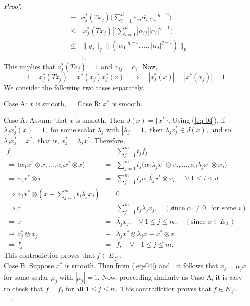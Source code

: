 \documentclass{amsart}
\theoremstyle{definition}
\theoremstyle{remark}
\numberwithin{equation}{section}
\begin{document}
\begin{proof}
\begin{eqnarray*}
&=&x_j^*(Tx_j)\Big(\sum_{i=1}^d\alpha_{ij}\overline{\alpha_i}|\alpha_i|^{q-2}\Big)\\
&\leq&|x_j^*(Tx_j)|\Big(\sum_{i=1}^d|\alpha_{ij}||\alpha_i|^{q-1}\Big)\\
&\leq & \|y_j\|_q\|(|\alpha_1|^{q-1},\ldots,|\alpha_d|^{q-1})\|_p\\
&=&1.
\end{eqnarray*}
This implies that $x_j^*(Tx_j)=1$ and $\alpha_{ij}=\alpha_i.$
Now, 
\begin{equation}\label{eq-04}
1=x_j^*(Tx_j)=x^*(x_j)x_j^*(x)\quad \Rightarrow \quad |x_j^*(x)|=|x^*(x_j)|=1.
\end{equation}
We consider the following two cases separately.
\begin{center}
Case A: $x$ is smooth, $\quad$ Case B: $x^*$ is smooth.
\end{center}
Case A:
Assume that $x$ is smooth. Then $J(x)=\{x^*\}.$ Using (\ref{eq-04}), if $\lambda_jx_j^*(x)=1,$ for some scalar $\lambda_j$ with $|\lambda_j|=1,$ then $\lambda_jx_j^*\in J(x),$ and so $\lambda_jx_j^*=x^*,$ that is, $x_j^*=\overline{\lambda_j}x^*.$ Therefore,
\begin{eqnarray*}
	f&=&\sum_{j=1}^mt_jf_j\\
	\Rightarrow \Big(\alpha_1x^*\otimes x,\ldots,\alpha_dx^*\otimes x \Big)&=&\sum_{j=1}^mt_j\Big(\alpha_1\overline{\lambda_j}x^*\otimes x_j,\ldots,\alpha_d\overline{\lambda_j}x^*\otimes x_j \Big)\\
	\Rightarrow \alpha_ix^*\otimes x&=&\sum_{j=1}^mt_j\alpha_i\overline{\lambda_j}x^*\otimes x_j ,\quad \forall~ 1\leq i\leq d \\
	\Rightarrow \alpha_ix^*\otimes (x-\sum_{j=1}^m t_j\overline{\lambda_j}x_j)&=&0\\
	\Rightarrow x&=&\sum_{j=1}^mt_j \overline{\lambda_j}x_j, \quad (\text{since } \alpha_i\neq 0, \text{ for some } i)\\
	\Rightarrow x&=& \overline{\lambda_j}x_j, \quad \forall~1\leq j\leq m,\quad(\text{since } x\in E_{\mathcal{X}})\\
	\Rightarrow x_j^*\otimes x_j&=& \overline{\lambda_j}x^*\otimes \lambda_jx=x^*\otimes x\\
	\Rightarrow f_j&=&f, \quad \forall\quad 1\leq j\leq m.  
	\end{eqnarray*}
This contradiction proves that $f\in E_{\mathcal{Z}^*}.$\\
Case B: Suppose $x^*$ is smooth. Then from (\ref{eq-04}) and \cite[Ch. 6]{MPS}, it follows that $x_j=\mu_jx$ for some scalar $\mu_j$ with $|\mu_j|=1.$ Now, proceeding similarly as Case A, it is easy to check that $f=f_j$ for all $1\leq j\leq m.$ This contradiction proves that $f\in E_{\mathcal{Z}^*}.$\\


\end{proof}
\end{document}
